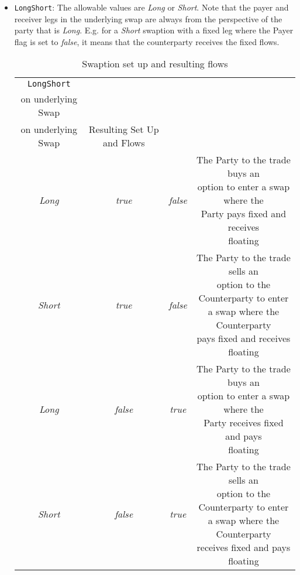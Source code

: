 \begin{itemize}
\item \lstinline!LongShort!: The allowable values are \emph{Long} or \emph{Short}. Note that the payer and receiver legs in the underlying swap are always from the perspective of the party that is \emph{Long}. E.g. for a \emph{Short} swaption with a fixed leg where the Payer flag is set to \emph{false}, it means that the counterparty receives the fixed flows.  

\begin{table}[H]
\centering
\begin{tabular} {| c | c | c | c |}    \hline
        \lstinline!LongShort! & \makecell{\lstinline!Payer! for Fixed leg \\ on underlying Swap} & \makecell{\lstinline!Payer! for Floating leg \\ on underlying Swap} & Resulting Set Up and Flows \\  \hline
   \emph{Long} & \emph{true} & \emph{false} & \makecell[l]{The Party to the trade buys an \\ option to enter a swap where the \\ Party pays fixed and receives \\ floating}  \\  \hline
    \emph{Short} & \emph{true} & \emph{false} & \makecell[l]{The Party to the trade sells an \\ option to the Counterparty to enter \\ a swap where the Counterparty \\ pays fixed and receives floating}  \\  \hline
    \emph{Long} & \emph{false} & \emph{true} & \makecell[l]{The Party to the trade buys an \\ option to enter a swap where the \\ Party receives fixed and pays \\ floating}  \\  \hline
    \emph{Short} & \emph{false} & \emph{true} & \makecell[l]{The Party to the trade sells an \\ option to the Counterparty to enter \\ a swap where the Counterparty \\ receives fixed and pays floating}  \\  \hline        
  \end{tabular}
  \caption{Swaption set up and resulting flows}
  \label{tab:swaption_setup}
\end{table}





\end{itemize}
